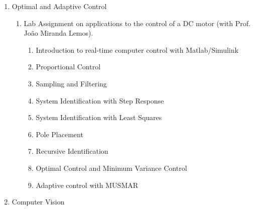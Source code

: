 \documentclass[
]{article}
\begin{document}
\begin{enumerate}
\begin{enumerate}
    \begin{enumerate}
    \def\labelenumiii{\roman{enumiii}.}
    \item
      Use Simulink Real-Time Workshop to Interface with the Dynamical
      System (send actuation commands and read sensor data).
    \item
      Calibrate system sensors.
    \item
      Methods to prepare data for identification: sampling, filtering
      and detrending.
    \item
      Non-parametric identification: Spectral Analysis from Chirp
      Signals.
    \item
      Parametric Identification: ARMAX model estimation with PRBS
      signals.
    \item
      LQ controller design.
    \item
      LQE estimator design.
    \item
      LQG controller design.
    \item
      Integral Control and Anti-Windup.
    \end{enumerate}
  \end{enumerate}
\item
  Optimal and Adaptive Control

  \begin{enumerate}
  \def\labelenumii{\alph{enumii}.}
  \item
    Lab Assignment on applications to the control of a DC motor (with
    Prof. João Miranda Lemos).

    \begin{enumerate}
    \def\labelenumiii{\roman{enumiii}.}
    \item
      Introduction to real-time computer control with Matlab/Simulink
    \item
      Proportional Control
    \item
      Sampling and Filtering
    \item
      System Identification with Step Response
    \item
      System Identification with Least Squares
    \item
      Pole Placement
    \item
      Recursive Identification
    \item
      Optimal Control and Minimum Variance Control
    \item
      Adaptive control with MUSMAR
    \end{enumerate}
  \end{enumerate}
\item
  Computer Vision


\end{enumerate}
\end{document}

